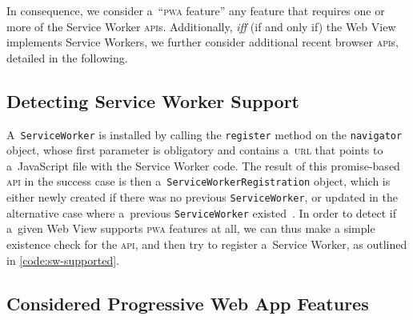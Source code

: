 \documentclass[sigconf,hyphens]{acmart}
\begin{document}
In consequence, we consider a~``\textsc{pwa} feature''
any feature that requires  one or more of the Service Worker \textsc{api}s.
Additionally, \emph{iff} (if and only if) the Web View implements Service Workers,
we further consider additional recent browser \textsc{api}s,
detailed in the following.

\subsection{Detecting Service Worker Support}

A~\texttt{ServiceWorker} is installed by calling the \texttt{register} method
on the \texttt{navigator} object, whose first parameter is obligatory
and contains a~\textsc{url} that points to a~JavaScript file with the Service Worker code.
The result of this promise-based \textsc{api} in the success case is then
a~\texttt{ServiceWorkerRegistration} object,
which is either newly created if there was no previous \texttt{ServiceWorker},
or updated in the alternative case
where a~previous \texttt{ServiceWorker} existed~\cite{russell2017serviceworkers}.
In order to detect if a~given Web View supports \textsc{pwa} features at all,
we can thus make a simple existence check for the \textsc{api},
and then try to register a~Service Worker, as outlined in \autoref{code:sw-supported}.

\subsection{Considered Progressive Web App Features}
\end{document}
